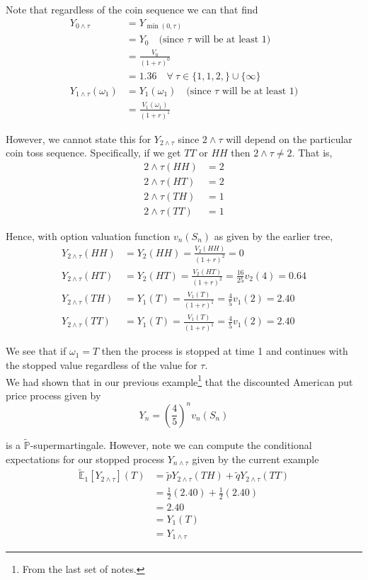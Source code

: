 \documentclass[12pt]{article}
\newlength\tindent
\renewcommand{\indent}{\hspace*{\tindent}}
\renewcommand{\P}{\mathbb P}
\newcommand{\E}{\mathbb E}
\begin{document}
Note that regardless of the coin sequence we can that find
\begin{align*}
	Y_{0\land\tau} &= Y_{\min(0,\tau)} \\
	&= Y_0 \quad \text{(since $\tau$ will be at least 1)} \\
	&= \frac{V_0}{(1 + r)^0} \\
	&= 1.36 \quad \forall~\tau\in \{1,1,2,\}\cup\{\infty\} \\
	Y_{1\land\tau}(\omega_1) &= Y_1(\omega_1) \quad \text{(since $\tau$ will be at least 1)} \\
	&= \frac{V_1(\omega_1)}{(1 + r)^1} 
\end{align*}

\indent However, we cannot state this for $Y_{2\land\tau}$ since $2\land\tau$ will depend on the particular coin toss sequence. Specifically, if we get $TT$ or $HH$ then $2\land\tau \neq 2$. That is,
\begin{align*}
	2\land\tau(HH) &= 2 \\
	2\land\tau(HT) &= 2 \\
	2\land\tau(TH) &= 1 \\
	2\land\tau(TT) &= 1
\end{align*}

Hence, with option valuation function $v_n(S_n)$ as given by the earlier tree,
\begin{align*}
	Y_{2\land\tau}(HH) &= Y_2(HH) = \frac{V_2(HH)}{(1 + r)^2} = 0 \\
	Y_{2\land\tau}(HT) &= Y_2(HT) = \frac{V_2(HT)}{(1 + r)^2} = \frac{16}{25}v_2(4) = 0.64 \\
	Y_{2\land\tau}(TH) &= Y_1(T) = \frac{V_1(T)}{(1 + r)^1} = \frac{4}{5}v_1(2) = 2.40 \\
	Y_{2\land\tau}(TT) &= Y_1(T) = \frac{V_1(T)}{(1 + r)^1} = \frac{4}{5}v_1(2) = 2.40
\end{align*}

\indent We see that if $\omega_1 = T$ then the process is stopped at time 1 and continues with the stopped value regardless of the value for $\tau$. \\

We had shown that in our previous example\footnote{From the last set of notes.} that the discounted American put price process given by
\begin{equation*}
	Y_n = \left(\frac{4}{5}\right)^n v_n(S_n)
\end{equation*}

is a $\tilde{\P}$-supermartingale. However, note we can compute the conditional expectations for our stopped process $Y_{n\land\tau}$ given by the current example
\begin{align*}
	\tilde{\E}_1\left[ Y_{2\land\tau} \right](T) &= \tilde{p} Y_{2\land\tau}(TH) + \tilde{q} Y_{2\land\tau}(TT) \\
	&= \frac{1}{2}(2.40) + \frac{1}{2}(2.40) \\
	&= 2.40 \\
	&= Y_1(T) \\
	&= Y_{1\land\tau} 
\end{align*}
\end{document}
